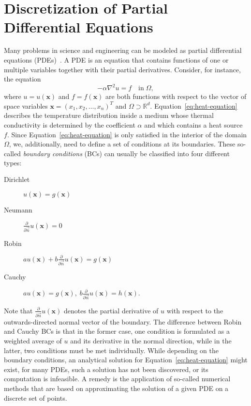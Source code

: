 \section{Discretization of Partial Differential Equations}\label{sec:discretization}
Many problems in science and engineering can be modeled as partial differential equations (PDEs)~\cite{folland2020introduction,evans2010partial}.
A PDE is an equation that contains functions of one or multiple variables together with their partial derivatives.
Consider, for instance, the equation
\begin{equation}
	-\alpha \nabla^2 u = f \quad \text{in} \; \Omega,
	\label{eq:heat-equation}
\end{equation}
where $u = u(\bm{x})$ and $f = f(\bm{x})$ are both functions with respect to the vector of space variables $\bm{x} = (x_1, x_2, \dots, x_n)^T$ and $\Omega \supset \mathbb{R}^d$.
Equation~\eqref{eq:heat-equation} describes the temperature distribution inside a medium whose thermal conductivity is determined by the coefficient $\alpha$ and which contains a heat source $f$.
Since Equation~\eqref{eq:heat-equation} is only satisfied in the interior of the domain $\Omega$, we, additionally, need to define a set of conditions at its boundaries.
These so-called \emph{boundary conditions} (BCs) can usually be classified into four different types:
\begin{description}
	\item[Dirichlet] $u(\bm{x}) = g(\bm{x})$
	\item[Neumann] $\frac{\partial}{\partial \vec{n}} u(\bm{x}) = 0$
	\item[Robin] $a u(\bm{x}) + b \frac{\partial}{\partial \vec{n}} u(\bm{x}) = g(\bm{x})$
	\item[Cauchy] $a u(\bm{x}) = g(\bm{x}), \; b \frac{\partial}{\partial \vec{n}} u(\bm{x}) = h(\bm{x})$.
\end{description}
Note that $\frac{\partial}{\partial \vec{n}} u(\bm{x})$ denotes the partial derivative of $u$ with respect to the outwards-directed normal vector of the boundary.
The difference between Robin and Cauchy BCs is that in the former case, one condition is formulated as a weighted average of $u$ and its derivative in the normal direction, while in the latter, two conditions must be met individually.
While depending on the boundary conditions, an analytical solution for Equation~\eqref{eq:heat-equation} might exist, for many PDEs, such a solution has not been discovered, or its computation is infeasible.
A remedy is the application of so-called numerical methods that are based on approximating the solution of a given PDE on a discrete set of points. 
